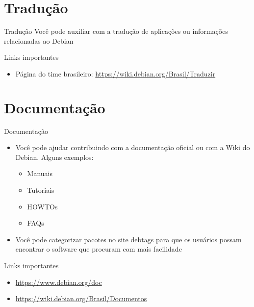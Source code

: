 \documentclass[10pt, compress, aspectratio=169]{beamer}
\begin{document}
\section{Tradução}

\begin{frame}{Tradução}
  Você pode auxiliar com a tradução de aplicações ou informações relacionadas
  ao Debian

  \begin{exampleblock}{Links importantes}
    \begin{itemize}
      \item Página do time brasileiro: \url{https://wiki.debian.org/Brasil/Traduzir}
    \end{itemize}
  \end{exampleblock}

\end{frame}

\section{Documentação}

\begin{frame}{Documentação}
  \begin{itemize}
    \item Você pode ajudar contribuindo com a documentação oficial ou com
          a Wiki do Debian. Alguns exemplos:
      \begin{itemize}
        \item Manuais
        \item Tutoriais
        \item HOWTOs
        \item FAQs
      \end{itemize}
    \item Você pode categorizar pacotes no site debtags para que os usuários
          possam encontrar o software que procuram com mais facilidade
  \end{itemize}

  \begin{exampleblock}{Links importantes}
    \begin{itemize}
      \item \url{https://www.debian.org/doc}
      \item \url{https://wiki.debian.org/Brasil/Documentos}
    \end{itemize}
  \end{exampleblock}
\end{frame}
\end{document}
